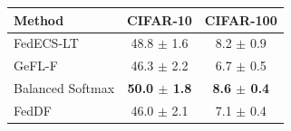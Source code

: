 \begin{tabular}{lcc}
\toprule
Method & CIFAR-10 & CIFAR-100\\
\midrule
FedECS-LT & 48.8 $\pm$ 1.6 & 8.2 $\pm$ 0.9\\
GeFL-F & 46.3 $\pm$ 2.2 & 6.7 $\pm$ 0.5\\
Balanced Softmax & \textbf{50.0 $\pm$ 1.8} & \textbf{8.6 $\pm$ 0.4}\\
FedDF & 46.0 $\pm$ 2.1 & 7.1 $\pm$ 0.4\\
\bottomrule
\end{tabular}
